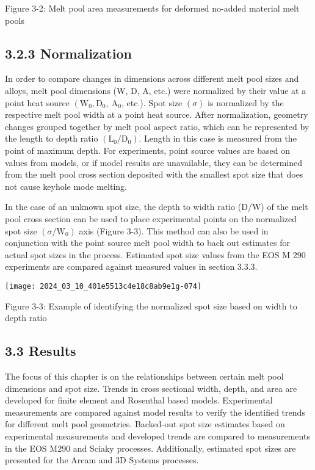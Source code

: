 \documentclass[10pt]{article}
\begin{document}
Figure 3-2: Melt pool area measurements for deformed no-added material melt pools

\subsection*{3.2.3 Normalization}
In order to compare changes in dimensions across different melt pool sizes and alloys, melt pool dimensions (W, D, A, etc.) were normalized by their value at a point heat source $\left(\mathrm{W}_{0}, \mathrm{D}_{0}, \mathrm{~A}_{0}\right.$, etc.). Spot size $(\sigma)$ is normalized by the respective melt pool width at a point heat source. After normalization, geometry changes grouped together by melt pool aspect ratio, which can be represented by the length to depth ratio $\left(\mathrm{L}_{0} / \mathrm{D}_{0}\right)$. Length in this case is measured from the point of maximum depth. For experiments, point source values are based on values from models, or if model results are unavailable, they can be determined from the melt pool cross section deposited with the smallest spot size that does not cause keyhole mode melting.

In the case of an unknown spot size, the depth to width ratio (D/W) of the melt pool cross section can be used to place experimental points on the normalized spot size $\left(\sigma / \mathrm{W}_{0}\right)$ axis (Figure 3-3). This method can also be used in conjunction with the point source melt pool width to back out estimates for actual spot sizes in the process. Estimated spot size values from the EOS M 290 experiments are compared against measured values in section 3.3.3.

\begin{center}
\texttt{[image: 2024\_03\_10\_401e5513c4e18c8ab9e1g-074]}
\end{center}

Figure 3-3: Example of identifying the normalized spot size based on width to depth ratio

\subsection*{3.3 Results}
The focus of this chapter is on the relationships between certain melt pool dimensions and spot size. Trends in cross sectional width, depth, and area are developed for finite element and Rosenthal based models. Experimental measurements are compared against model results to verify the identified trends for different melt pool geometries. Backed-out spot size estimates based on experimental measurements and developed trends are compared to measurements in the EOS M290 and Sciaky processes. Additionally, estimated spot sizes are presented for the Arcam and 3D Systems processes.
\end{document}
